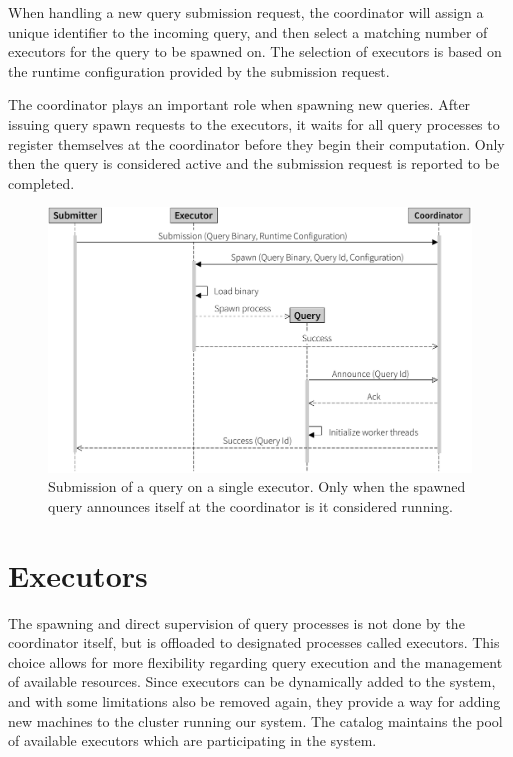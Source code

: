 When handling a new query submission request, the coordinator will assign a
unique identifier to the incoming query, and then select a
matching number of executors for the query to be spawned on. The selection
of executors is based on the runtime configuration provided by the submission
request.

The coordinator plays an important role when spawning new queries. After
issuing query spawn requests to the executors, it waits for all query processes
to register themselves at the coordinator before they begin their computation.
Only then the query is considered active and the submission request
is reported to be completed.

\begin{figure}[htb]
  \centering
    \includegraphics[width=1\textwidth]{figures/spawn_singleprocess}
  \caption[Query submission with a single process]{Submission of a query on a single executor.
  Only when the spawned query announces itself at the coordinator is it considered running.}
  \label{fig:subsingle}
\end{figure}

\section{Executors}

The spawning and direct supervision of query processes is not done by the
coordinator itself, but is offloaded to designated processes called executors.
This choice allows for more flexibility regarding query execution and the
management of available resources. Since executors can be dynamically added
to the system, and with some limitations also be removed again, they provide
a way for adding new machines to the cluster running our system. The catalog
maintains the pool of available executors which are participating in the system.

